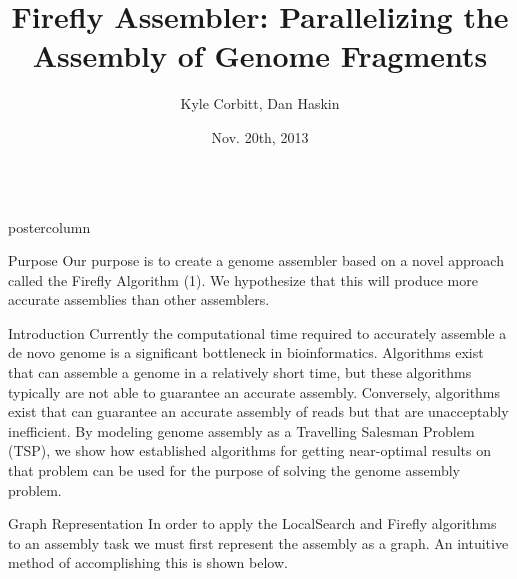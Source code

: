 \documentclass[final,hyperref={pdfpagelabels=false}]{beamer}
\title{\huge Firefly Assembler: Parallelizing the Assembly of Genome Fragments}
\author{Kyle Corbitt, Dan Haskin}
\institute[Brigham Young University]{Molecular Biology and Computer Science Departments}
\date[Nov. 20th, 2013]{Nov. 20th, 2013}
\newlength{\columnheight}
\begin{document}
\begin{frame}
    \begin{columns}
        \begin{column}{.32\textwidth}
            \begin{beamercolorbox}[center,wd=\textwidth]{postercolumn}
                \begin{minipage}[T]{.95\textwidth}
                    \parbox[t][\columnheight]{\textwidth}{
                        \begin{block}{Purpose}
                            Our purpose is to create a genome assembler based
                            on a novel approach called the Firefly Algorithm
                            (1).  We hypothesize that this will produce more
                            accurate assemblies than other assemblers.
                        \end{block}
                        \begin{block}{Introduction}
                            Currently the computational time required to
                            accurately assemble a de novo genome is a
                            significant bottleneck in bioinformatics.
                            Algorithms exist that can assemble a genome in a
                            relatively short time, but these algorithms
                            typically are not able to guarantee an accurate
                            assembly. Conversely, algorithms exist that can
                            guarantee an accurate assembly of reads but that
                            are unacceptably inefficient.  By modeling genome
                            assembly as a Travelling Salesman Problem (TSP), we
                            show how established algorithms for getting
                            near-optimal results on that problem can be used
                            for the purpose of solving the genome assembly
                            problem.
                        \end{block}
                        \begin{block}{Graph Representation}
                            In order to apply the LocalSearch and Firefly
                            algorithms to an assembly task we must first
                            represent the assembly as a graph.  An intuitive
                            method of accomplishing this is shown below.
                            \begin{center}

\end{center}
\end{block}}
\end{minipage}
\end{beamercolorbox}
\end{column}
\end{columns}
\end{frame}
\end{document}
